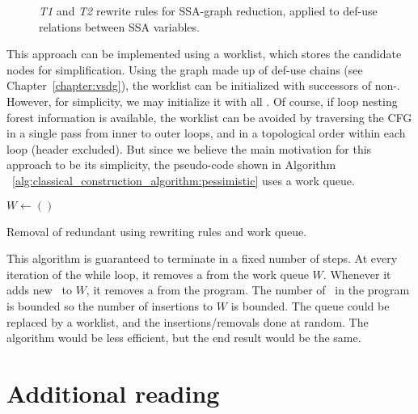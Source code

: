 {\begin{figure}
  \vspace{2em}
  \caption{\label{fig:t1t2transforms}\emph{T1} and \emph{T2} rewrite rules for SSA-graph reduction, applied to def-use relations between SSA variables.}
\end{figure}

This approach can be implemented using a worklist, which stores the candidate nodes for simplification. 
Using the graph made up of def-use chains (see Chapter~\ref{chapter:vsdg}), the worklist can be initialized with successors of non-\phifuns. 
However, for simplicity, we may initialize it with all \phifuns. 
Of course, if loop nesting forest information is available, the worklist can be avoided by traversing the CFG in a single pass from inner to outer loops, and in a topological order within each loop (header excluded). 
But since we believe the main motivation for this approach to be its simplicity, the pseudo-code shown in Algorithm ~\ref{alg:classical_construction_algorithm:pessimistic} uses a work queue.


\begin{algorithm}[h]
$W \leftarrow ()$ \;
\caption{\label{alg:classical_construction_algorithm:pessimistic}
Removal of redundant \phifuns using rewriting rules and work queue.}
\end{algorithm}

This algorithm is guaranteed to terminate in a fixed number of steps. 
At every iteration of the while loop, it removes a \phifun from the work queue $W$. 
Whenever it adds new \phifuns\ to $W$, it removes a \phifun from the program. 
The number of \phifuns\ in the program is bounded so the number of insertions to $W$ is bounded. 
The queue could be replaced by a worklist, and the insertions/removals done at random. 
The algorithm would be less efficient, but the end result would be the same.

\section{Additional reading}
\label{sec:classical_construction_algorithm:reading}

}
